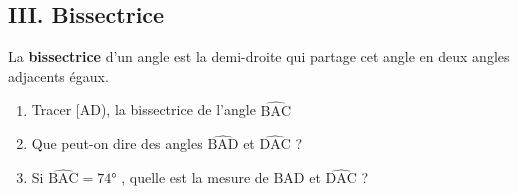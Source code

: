 \subsection*{III.  Bissectrice}


\begin{Définition}[c]
La \textbf{bissectrice} d'un angle est la demi-droite qui partage cet angle en deux angles adjacents égaux.
\end{Définition}

\begin{Exemple}
\begin{minipage}[c]{0.6\textwidth}
\begin{enumerate}
\item Tracer [AD), la bissectrice de l'angle $\widehat{\text{BAC}}$
\item Que peut-on dire des angles $\widehat{\text{BAD}}$ et $\widehat{\text{DAC}}$ ? 

\ligne

\item Si $\widehat{\text{BAC}}=74$° , quelle est la mesure de $\widehat{\text{BAD}}$ et $\widehat{\text{DAC}} $ ?

\ligne

\ligne

\ligne

\end{enumerate}
\end{minipage} \hfill
\begin{minipage}[c]{0.4\textwidth}



\end{minipage} 

\end{Exemple}

